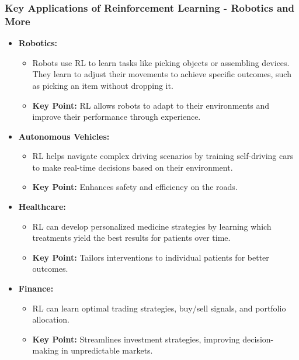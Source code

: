 \documentclass[aspectratio=169]{beamer}
\begin{document}
\begin{frame}[fragile]
    \frametitle{Key Applications of Reinforcement Learning - Robotics and More}
    \begin{itemize}
        \item \textbf{Robotics:}
        \begin{itemize}
            \item Robots use RL to learn tasks like picking objects or assembling devices. They learn to adjust their movements to achieve specific outcomes, such as picking an item without dropping it.
            \item \textbf{Key Point:} RL allows robots to adapt to their environments and improve their performance through experience.
        \end{itemize}
        
        \item \textbf{Autonomous Vehicles:}
        \begin{itemize}
            \item RL helps navigate complex driving scenarios by training self-driving cars to make real-time decisions based on their environment.
            \item \textbf{Key Point:} Enhances safety and efficiency on the roads.
        \end{itemize}

        \item \textbf{Healthcare:}
        \begin{itemize}
            \item RL can develop personalized medicine strategies by learning which treatments yield the best results for patients over time.
            \item \textbf{Key Point:} Tailors interventions to individual patients for better outcomes.
        \end{itemize}

        \item \textbf{Finance:}
        \begin{itemize}
            \item RL can learn optimal trading strategies, buy/sell signals, and portfolio allocation.
            \item \textbf{Key Point:} Streamlines investment strategies, improving decision-making in unpredictable markets.
        \end{itemize}
    \end{itemize}
\end{frame}
\end{document}
